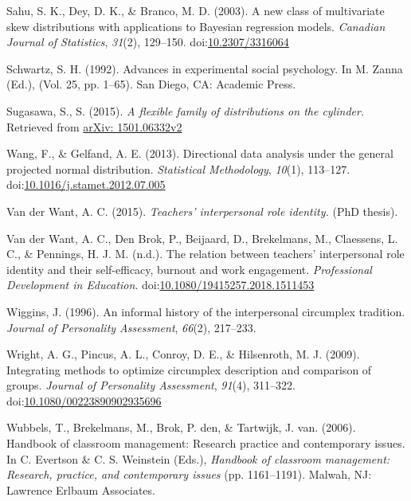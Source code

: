 \documentclass[man]{apa6}
\DeclareRobustCommand{\VANDER}[3]{#2}
\theoremstyle{definition}
\theoremstyle{definition}
\theoremstyle{definition}
\theoremstyle{remark}
\begin{document}
\leavevmode\hypertarget{ref-sahu2003new}{}%
Sahu, S. K., Dey, D. K., \& Branco, M. D. (2003). A new class of
multivariate skew distributions with applications to Bayesian regression
models. \emph{Canadian Journal of Statistics}, \emph{31}(2), 129--150.
doi:\href{https://doi.org/10.2307/3316064}{10.2307/3316064}

\leavevmode\hypertarget{ref-schwartz1992values}{}%
Schwartz, S. H. (1992). Advances in experimental social psychology. In
M. Zanna (Ed.), (Vol. 25, pp. 1--65). San Diego, CA: Academic Press.

\leavevmode\hypertarget{ref-sugasawa2015flexible}{}%
Sugasawa, S., S. (2015). \emph{A flexible family of distributions on the
cylinder}. Retrieved from
\href{arXiv:\%201501.06332v2}{arXiv: 1501.06332v2}

\leavevmode\hypertarget{ref-wang2012directional}{}%
Wang, F., \& Gelfand, A. E. (2013). Directional data analysis under the
general projected normal distribution. \emph{Statistical Methodology},
\emph{10}(1), 113--127.
doi:\href{https://doi.org/10.1016/j.stamet.2012.07.005}{10.1016/j.stamet.2012.07.005}

\leavevmode\hypertarget{ref-vanderWant2015role}{}%
\VANDER{Want}{Van der}{van der} Want, A. C. (2015). \emph{Teachers'
interpersonal role identity.} (PhD thesis).

\leavevmode\hypertarget{ref-want2018selfefficacy}{}%
\VANDER{Want}{Van der}{van der} Want, A. C., Den Brok, P., Beijaard, D.,
Brekelmans, M., Claessens, L. C., \& Pennings, H. J. M. (n.d.). The
relation between teachers' interpersonal role identity and their
self-efficacy, burnout and work engagement. \emph{Professional
Development in Education}.
doi:\href{https://doi.org/10.1080/19415257.2018.1511453}{10.1080/19415257.2018.1511453}

\leavevmode\hypertarget{ref-wiggins1996history}{}%
Wiggins, J. (1996). An informal history of the interpersonal circumplex
tradition. \emph{Journal of Personality Assessment}, \emph{66}(2),
217--233.

\leavevmode\hypertarget{ref-wright2009integrating}{}%
Wright, A. G., Pincus, A. L., Conroy, D. E., \& Hilsenroth, M. J.
(2009). Integrating methods to optimize circumplex description and
comparison of groups. \emph{Journal of Personality Assessment},
\emph{91}(4), 311--322.
doi:\href{https://doi.org/10.1080/00223890902935696}{10.1080/00223890902935696}

\leavevmode\hypertarget{ref-wubbels2006interpersonal}{}%
Wubbels, T., Brekelmans, M., Brok, P. den, \& Tartwijk, J. van. (2006).
Handbook of classroom management: Research practice and contemporary
issues. In C. Evertson \& C. S. Weinstein (Eds.), \emph{Handbook of
classroom management: Research, practice, and contemporary issues} (pp.
1161--1191). Malwah, NJ: Lawrence Erlbaum Associates.
\end{document}
